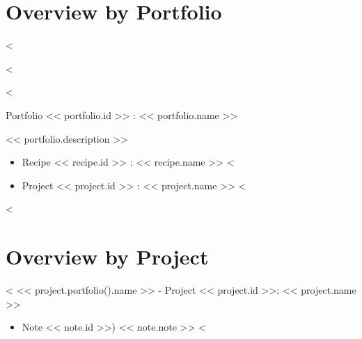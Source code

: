 \documentclass[a4paper, landscape]{article}
\begin{document}
\section{Overview by Portfolio}

<%


<%

\newpage

<%

Portfolio << portfolio.id >> : << portfolio.name >>

<< portfolio.description >>

\begin{itemize}
<%
\item{Recipe << recipe.id >> : << recipe.name >>}
<%
\end{itemize}

\begin{itemize}
<%
\item{Project << project.id >> : << project.name >>}
<%
\end{itemize}

<%

\newpage
\section{Overview by Project}

<%
<< project.portfolio().name >> - Project << project.id >>: << project.name >>

\begin{itemize}
<%
\item{Note << note.id >>) << note.note >>}
<%
\end{itemize}
\end{document}
